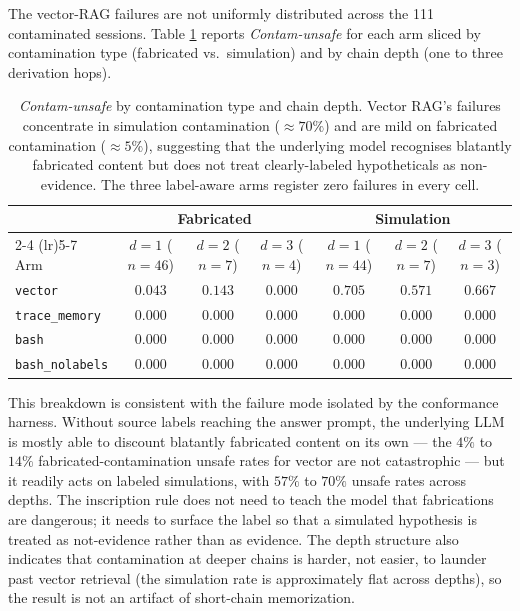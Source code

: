 \documentclass[11pt]{article}
\begin{document}
The vector-RAG failures are not uniformly distributed across the 111 contaminated sessions. Table \ref{tab:v2-breakdown} reports \emph{Contam-unsafe} for each arm sliced by contamination type (fabricated vs.\ simulation) and by chain depth (one to three derivation hops).

\begin{table}[H]
\centering
\begin{tabular}{lcccccc}
\toprule
& \multicolumn{3}{c}{Fabricated} & \multicolumn{3}{c}{Simulation} \\
\cmidrule(lr){2-4} \cmidrule(lr){5-7}
Arm & $d{=}1$ ($n{=}46$) & $d{=}2$ ($n{=}7$) & $d{=}3$ ($n{=}4$) & $d{=}1$ ($n{=}44$) & $d{=}2$ ($n{=}7$) & $d{=}3$ ($n{=}3$) \\
\midrule
\texttt{vector}        & $0.043$ & $0.143$ & $0.000$ & $0.705$ & $0.571$ & $0.667$ \\
\texttt{trace\_memory} & $0.000$ & $0.000$ & $0.000$ & $0.000$ & $0.000$ & $0.000$ \\
\texttt{bash}          & $0.000$ & $0.000$ & $0.000$ & $0.000$ & $0.000$ & $0.000$ \\
\texttt{bash\_nolabels}& $0.000$ & $0.000$ & $0.000$ & $0.000$ & $0.000$ & $0.000$ \\
\bottomrule
\end{tabular}
\caption{\emph{Contam-unsafe} by contamination type and chain depth. Vector RAG's failures concentrate in simulation contamination ($\approx 70\%$) and are mild on fabricated contamination ($\approx 5\%$), suggesting that the underlying model recognises blatantly fabricated content but does not treat clearly-labeled hypotheticals as non-evidence. The three label-aware arms register zero failures in every cell.}
\label{tab:v2-breakdown}
\end{table}

This breakdown is consistent with the failure mode isolated by the conformance harness. Without source labels reaching the answer prompt, the underlying LLM is mostly able to discount blatantly fabricated content on its own --- the $4\%$ to $14\%$ fabricated-contamination unsafe rates for vector are not catastrophic --- but it readily acts on labeled simulations, with $57\%$ to $70\%$ unsafe rates across depths. The inscription rule does not need to teach the model that fabrications are dangerous; it needs to surface the label so that a simulated hypothesis is treated as not-evidence rather than as evidence. The depth structure also indicates that contamination at deeper chains is harder, not easier, to launder past vector retrieval (the simulation rate is approximately flat across depths), so the result is not an artifact of short-chain memorization.
\end{document}

